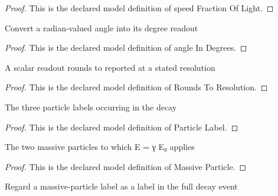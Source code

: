 \begin{proof}
  This is the declared model definition of speed Fraction Of Light.
\end{proof}
\begin{definition}
  \label{def:physics:phyx-mini-0556:phyxminiproblems-problemphyxmini0556-angleindegrees}
  Convert a radian-valued angle into its degree readout
\end{definition}
\begin{proof}
  This is the declared model definition of angle In Degrees.
\end{proof}
\begin{definition}
  \label{def:physics:phyx-mini-0556:phyxminiproblems-problemphyxmini0556-roundstoresolution}
  A scalar readout rounds to reported at a stated resolution
\end{definition}
\begin{proof}
  This is the declared model definition of Rounds To Resolution.
\end{proof}
\begin{definition}
  \label{def:physics:phyx-mini-0556:phyxminiproblems-problemphyxmini0556-particlelabel}
  The three particle labels occurring in the decay
\end{definition}
\begin{proof}
  This is the declared model definition of Particle Label.
\end{proof}
\begin{definition}
  \label{def:physics:phyx-mini-0556:phyxminiproblems-problemphyxmini0556-massiveparticle}
  The two massive particles to which E = γ E₀ applies
\end{definition}
\begin{proof}
  This is the declared model definition of Massive Particle.
\end{proof}
\begin{definition}
  \label{def:physics:phyx-mini-0556:phyxminiproblems-problemphyxmini0556-massiveparticle-toparticlelabel}
  Regard a massive-particle label as a label in the full decay event
\end{definition}
